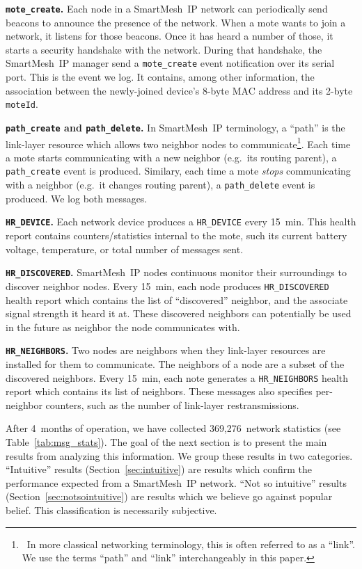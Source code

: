 \documentclass{sig-alternate}
\newcommand{\smip}                {SmartMesh~IP\xspace}
\newcommand{\HRNEIGHBORS}         {{\tt HR\_NEIGHBORS}\xspace}
\newcommand{\HRDISCOVERED}        {{\tt HR\_DISCOVERED}\xspace}
\newcommand{\HRDEVICE}            {{\tt HR\_DEVICE}\xspace}
\newcommand{\pathcreate}          {{\tt path\_create}\xspace}
\newcommand{\pathdelete}          {{\tt path\_delete}\xspace}
\newcommand{\motecreate}          {{\tt mote\_create}\xspace}
\newcommand{\moteId}              {{\tt moteId}\xspace}
\begin{document}
\textbf{\motecreate.}
Each node in a \smip network can periodically send beacons to announce the presence of the network.
When a mote wants to join a network, it listens for those beacons.
Once it has heard a number of those, it starts a security handshake with the network.
During that handshake, the \smip manager send a \motecreate event notification over its serial port.
This is the event we log.
It contains, among other information, the association between the newly-joined device's 8-byte MAC address and its 2-byte \moteId.

\textbf{\pathcreate and \pathdelete.}
In \smip terminology, a ``path'' is the link-layer resource which allows two neighbor nodes to communicate\footnote{~In more classical networking terminology, this is often referred to as a ``link''. We use the terms ``path'' and ``link'' interchangeably in this paper.}.
Each time a mote starts communicating with a new neighbor (e.g.~its routing parent), a \pathcreate event is produced.
Similary, each time a mote \textit{stops} communicating with a neighbor (e.g.~it changes routing parent), a \pathdelete event is produced.
We log both messages.

\textbf{\HRDEVICE.}
Each network device produces a \HRDEVICE every 15~min.
This health report contains counters/statistics internal to the mote, such its current battery voltage, temperature, or total number of messages sent.

\textbf{\HRDISCOVERED.}
\smip nodes continuous monitor their surroundings to discover neighbor nodes.
Every 15~min, each node produces \HRDISCOVERED health report which contains the list of ``discovered'' neighbor, and the associate signal strength it heard it at.
These discovered neighbors can potentially be used in the future as neighbor the node communicates with.

\textbf{\HRNEIGHBORS.}
Two nodes are neighbors when they link-layer resources are installed for them to communicate.
The neighbors of a node are a subset of the discovered neighbors.
Every 15~min, each note generates a \HRNEIGHBORS health report which contains its list of neighbors.
These messages also specifies per-neighbor counters, such as the number of link-layer restransmissions.


After 4~months of operation, we have collected 369,276~network statistics (see Table~\ref{tab:msg_stats}).
The goal of the next section is to present the main results from analyzing this information.
We group these results in two categories.
``Intuitive'' results (Section~\ref{sec:intuitive}) are results which confirm the performance expected from a \smip network.
``Not so intuitive'' results (Section~\ref{sec:notsointuitive}) are results which we believe go against popular belief.
This classification is necessarily subjective.
\end{document}
